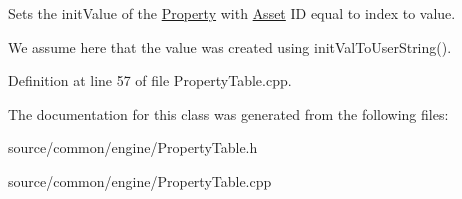 Sets the init\-Value of the \hyperlink{class_picto_1_1_property}{Property} with \hyperlink{class_picto_1_1_asset}{Asset} I\-D equal to index to value. 

We assume here that the value was created using init\-Val\-To\-User\-String(). 

Definition at line 57 of file Property\-Table.\-cpp.



The documentation for this class was generated from the following files\-:\begin{DoxyCompactItemize}
\item 
source/common/engine/Property\-Table.\-h\item 
source/common/engine/Property\-Table.\-cpp\end{DoxyCompactItemize}
